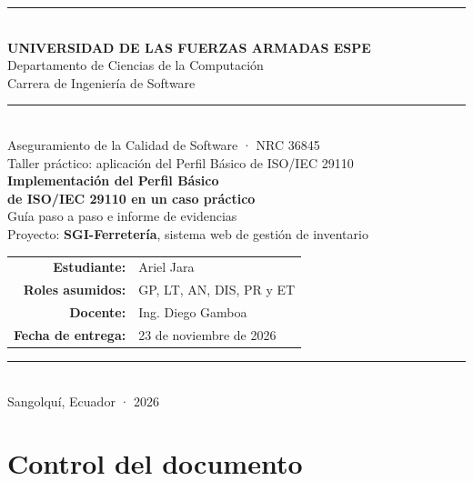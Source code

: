 \documentclass[11pt,a4paper]{article}
\begin{document}
\begin{titlepage}
\thispagestyle{empty}
\centering
{\color{verdeespe}\rule{\linewidth}{2pt}}\\[0.6cm]
{\Large\bfseries UNIVERSIDAD DE LAS FUERZAS ARMADAS ESPE}\\[0.25cm]
{\large Departamento de Ciencias de la Computación}\\[0.1cm]
{\large Carrera de Ingeniería de Software}\\[0.6cm]
{\color{verdeespe}\rule{\linewidth}{0.6pt}}\\[2.2cm]

{\large Aseguramiento de la Calidad de Software · NRC 36845}\\[0.3cm]
{\normalsize Taller práctico: aplicación del Perfil Básico de ISO/IEC 29110}\\[1.4cm]

{\huge\bfseries\color{verdeespe} Implementación del Perfil Básico\\[0.2cm] de ISO/IEC 29110 en un caso práctico}\\[0.7cm]
{\Large Guía paso a paso e informe de evidencias}\\[0.4cm]
{\large Proyecto: \textbf{SGI-Ferretería}, sistema web de gestión de inventario}\\[2.4cm]

\begin{tabular}{@{}>{\bfseries}r l@{}}
Estudiante: & Ariel Jara \\
Roles asumidos: & GP, LT, AN, DIS, PR y ET \\
Docente: & Ing. Diego Gamboa \\
Fecha de entrega: & 23 de noviembre de 2026 \\
\end{tabular}

\vfill
{\color{verdeespe}\rule{\linewidth}{0.6pt}}\\[0.2cm]
{\small Sangolquí, Ecuador · 2026}
\end{titlepage}

\section*{Control del documento}
\end{document}
